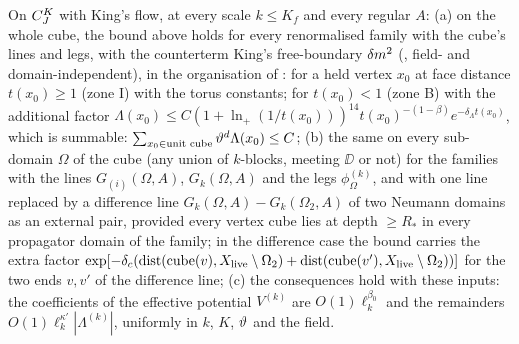 \begin{proposition}\label{prop:a01:TD}
On $C^{K}_{J}$ with King's flow, at every scale $k\le K_f$ and every regular $A$: (a) on the whole cube, the bound above holds for every renormalised family with the cube's lines and legs, with the counterterm King's free-boundary $\delta m^2$ (\cite[p.~330]{K2}, field- and domain-independent), in the organisation of \cite[p.~330]{K2}: for a held vertex $x_0$ at face distance $t(x_0)\ge1$ (zone I) with the torus constants; for $t(x_0)<1$ (zone B) with the additional factor $\Lambda(x_0)\le C(1+\ln_+(1/t(x_0)))^{14}t(x_0)^{-(1-\beta)}e^{-\delta_\Lambda t(x_0)}$, which is summable: $\sum_{x_0\in\text{unit cube}}\vartheta^d\Lambda(x_0)\le C$; (b) the same on every sub-domain $\Omega$ of the cube (any union of $k$-blocks, meeting $\DD$ or not) for the families with the lines $G_{(i)}(\Omega,A)$, $G_k(\Omega,A)$ and the legs $\phi^{(k)}_\Omega$, and with one line replaced by a difference line $G_k(\Omega,A)-G_k(\Omega_2,A)$ of two Neumann domains as an external pair, provided every vertex cube lies at depth $\ge R_*$ in every propagator domain of the family; in the difference case the bound carries the extra factor $\exp[-\delta_c(\operatorname{dist}(\mathrm{cube}(v),X_{\mathrm{live}}\setminus\Omega_2)+\operatorname{dist}(\mathrm{cube}(v'),X_{\mathrm{live}}\setminus\Omega_2))]$ for the two ends $v,v'$ of the difference line; (c) the consequences \cite[(3.58)]{Ba1} hold with these inputs: the coefficients of the effective potential $V^{(k)}$ are $O(1)\ell_k^{\beta_0}$ and the remainders $O(1)\ell_k^{\kappa'}|\Lambda^{(k)}|$, uniformly in $k$, $K$, $\vartheta$ and the field.
\end{proposition}
